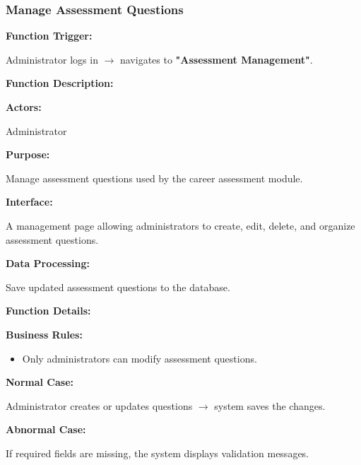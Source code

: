 \subsubsection{Manage Assessment Questions}

\textbf{Function Trigger:}

Administrator logs in $\rightarrow$ navigates to \textbf{"Assessment Management"}.

\vspace{0.3cm}

\textbf{Function Description:}

\textbf{Actors:}

Administrator

\vspace{0.2cm}

\textbf{Purpose:}

Manage assessment questions used by the career assessment module.

\vspace{0.2cm}

\textbf{Interface:}

A management page allowing administrators to create, edit, delete, and organize assessment questions.

\vspace{0.2cm}

\textbf{Data Processing:}

Save updated assessment questions to the database.

\vspace{0.3cm}

\textbf{Function Details:}

\textbf{Business Rules:}

\begin{itemize}
\item Only administrators can modify assessment questions.
\end{itemize}

\textbf{Normal Case:}

Administrator creates or updates questions $\rightarrow$ system saves the changes.

\textbf{Abnormal Case:}

If required fields are missing, the system displays validation messages.

%

